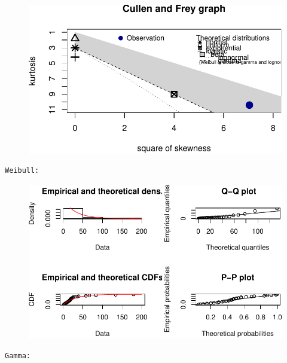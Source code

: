 \documentclass[
  letterpaper,
  DIV=11,
  numbers=noendperiod]{scrartcl}
\begin{document}
\begin{figure}[H]

{\centering \includegraphics{quiz5_files/figure-pdf/unnamed-chunk-35-1.pdf}

}

\end{figure}

\begin{verbatim}
Weibull: 
\end{verbatim}

\begin{figure}[H]

{\centering \includegraphics{quiz5_files/figure-pdf/unnamed-chunk-35-2.pdf}

}

\end{figure}

\begin{verbatim}
Gamma: 
\end{verbatim}
\end{document}
